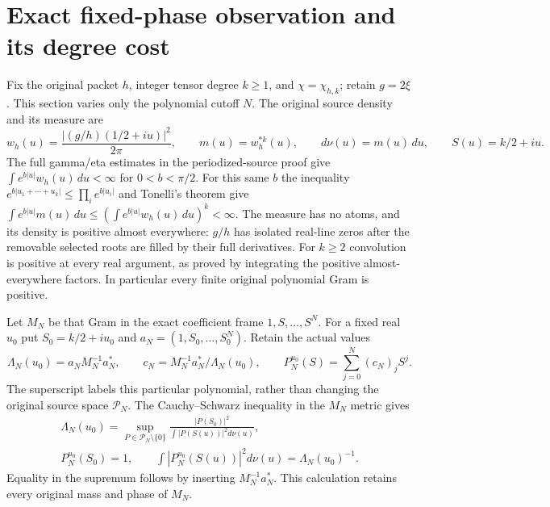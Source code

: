 \section{Exact fixed-phase observation and its degree cost}
\label{sec:holonomy-degree-cost}

Fix the original packet $h$, integer tensor degree $k\ge1$, and
$\chi=\chi_{h,k}$; retain $g=2\xi$. This section varies only the
polynomial cutoff $N$. The original source density and its measure are
\[
 w_h(u)=\frac{|(g/h)(1/2+iu)|^2}{2\pi},\qquad
 m(u)=w_h^{*k}(u),\qquad d\nu(u)=m(u)\,du,
 \qquad S(u)=k/2+iu .
 \tag{HD1}
\]
The full gamma/eta estimates in the periodized-source proof give
$\int e^{b|u|}w_h(u)\,du<\infty$ for $0<b<\pi/2$.
For this same $b$ the inequality
$e^{b|u_1+\cdots+u_k|}\le\prod_i e^{b|u_i|}$ and Tonelli's theorem
give
$\int e^{b|u|}m(u)\,du\le(\int e^{b|u|}w_h(u)\,du)^k<\infty$.
The measure has no atoms, and its density is positive almost everywhere:
$g/h$ has isolated real-line zeros after the removable selected roots
are filled by their full derivatives. For $k\ge2$ convolution is
positive at every real argument, as proved by integrating the positive
almost-everywhere factors. In particular every finite original
polynomial Gram is positive.

Let $M_N$ be that Gram in the exact coefficient frame
$1,S,\ldots,S^N$. For a fixed real $u_0$ put $S_0=k/2+iu_0$ and
$a_N=(1,S_0,\ldots,S_0^N)$. Retain the actual values
\[
 \Lambda_N(u_0)=a_NM_N^{-1}a_N^*,\qquad
 c_N=M_N^{-1}a_N^*/\Lambda_N(u_0),\qquad
 P_N^{u_0}(S)=\sum_{j=0}^N(c_N)_j S^j .
 \tag{HD2}
\]
The superscript labels this particular polynomial, rather than changing
the original source space $\mathcal P_N$. The Cauchy--Schwarz inequality
in the $M_N$ metric gives
\[
\begin{gathered}
 \Lambda_N(u_0)=\sup_{P\in\mathcal P_N\setminus\{0\}}
    \frac{|P(S_0)|^2}{\int|P(S(u))|^2d\nu(u)},\\
 P_N^{u_0}(S_0)=1,\qquad
 \int|P_N^{u_0}(S(u))|^2d\nu(u)=\Lambda_N(u_0)^{-1}.
\end{gathered}\tag{HD3}
\]
Equality in the supremum follows by inserting $M_N^{-1}a_N^*$.
This calculation retains every original mass and phase of $M_N$.

